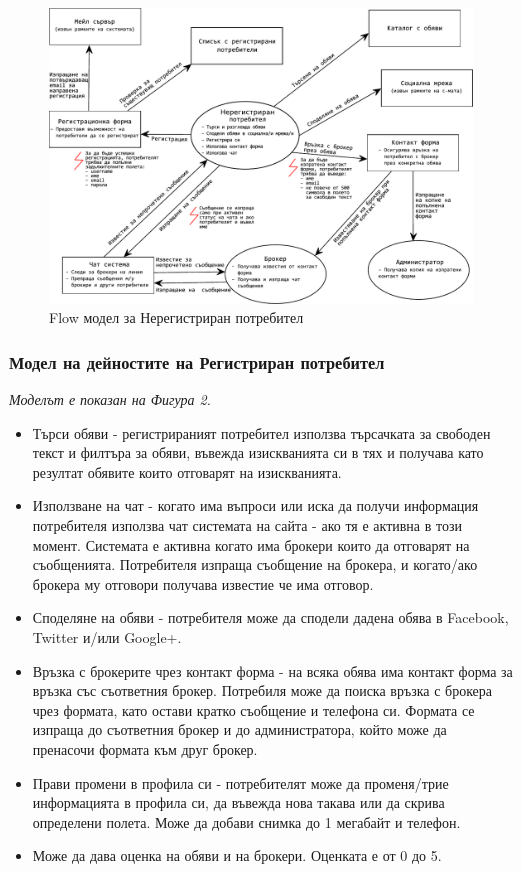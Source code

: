 \documentclass[a4paper]{article}
\begin{document}
	\begin{figure}[h]
	\centering
	\includegraphics[scale=0.75]{flow-unregistered-user}
	\caption{Flow модел за Нерегистриран потребител}
	\end{figure}
	
\subsubsection{Модел на дейностите на Регистриран потребител}	

\emph{Моделът е показан на Фигура 2.} 


\begin{itemize}
	\item {Търси обяви - регистрираният потребител използва търсачката за свободен текст и филтъра за обяви, въвежда изискванията си в тях и получава като резултат обявите които отговарят на изискванията.
}
	\item {Използване на чат - когато има въпроси или иска да получи информация потребителя използва чат системата на сайта - ако тя е активна в този момент. Системата е активна когато има брокери които да отговарят на съобщенията. Потребителя изпраща съобщение на брокера, и когато/ако брокера му отговори получава известие че има отговор.
}
	\item {Споделяне на обяви - потребителя може да сподели дадена обява в Facebook, Twitter и/или Google+.
}
	\item {Връзка с брокерите чрез контакт форма - на всяка обява има контакт форма за връзка със съответния брокер. Потребиля може да поиска връзка с брокера чрез формата, като остави кратко съобщение и телефона си. Формата се изпраща до съответния брокер и до администратора, който може да пренасочи формата към друг брокер.
}
	\item {Прави промени в профила си - потребителят може да променя/трие информацията в профила си, да въвежда нова такава или да скрива определени полета. Може да добави снимка до 1 мегабайт и телефон.
}
	\item {Може да дава оценка на обяви и на брокери. Оценката е от 0 до 5.
}
\end{itemize}
\end{document}
